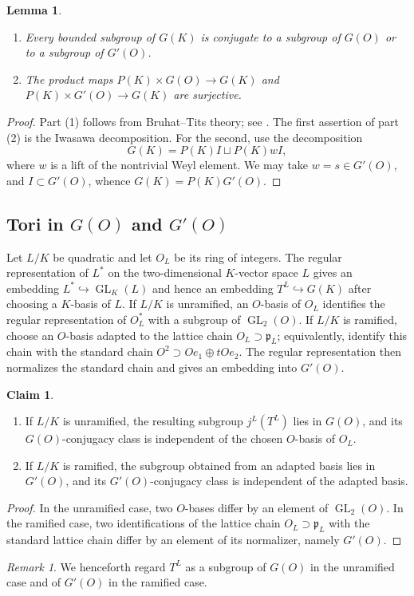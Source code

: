 \documentclass[11pt,a4paper,twoside]{amsart}
\newtheorem{lemma}[theorem]{Lemma}
\theoremstyle{definition}
\newtheorem{claim}[theorem]{Claim}
\theoremstyle{remark}
\newtheorem{remark}[theorem]{Remark}
\newcommand{\ho}{\hookrightarrow}
\begin{document}
\begin{lemma}\label{BT}
\begin{enumerate}
\item Every bounded subgroup of $G(K)$ is conjugate to a subgroup of $G(O)$ or to a subgroup of $G'(O)$.
\item The product maps $P(K)\times G(O)\to G(K)$ and $P(K)\times G'(O)\to G(K)$ are surjective.
\end{enumerate}
\end{lemma}
\begin{proof}
Part (1) follows from Bruhat--Tits theory; see \cite[Section~3.2]{BT}. The first assertion of part (2) is the Iwasawa decomposition. For the second, use the  decomposition
$$
G(K)=P(K)I\sqcup P(K)wI,
$$
where $w$ is a lift of the nontrivial Weyl element. We may take $w=s\in G'(O)$, and $I\subset G'(O)$, whence $G(K)=P(K)G'(O)$.
\end{proof}
\subsection{Tori in $G(O)$ and $G'(O)$}
Let $L/K$ be quadratic and let $O_L$ be its ring of integers. The regular representation of $L^*$ on the two-dimensional $K$-vector space $L$ gives an embedding $L^*\ho\operatorname{GL}_K(L)$ and hence an embedding $T^L\ho G(K)$ after choosing a $K$-basis of $L$.
If $L/K$ is unramified, an $O$-basis of $O_L$ identifies the regular representation of $O_L^*$ with a subgroup of $\operatorname{GL}_2(O)$. If $L/K$ is ramified, choose an $O$-basis adapted to the lattice chain $O_L\supset\mathfrak p_L$; equivalently, identify this chain with the standard chain $O^2\supset Oe_1\oplus tOe_2$. The regular representation then normalizes the standard chain and gives an embedding into $G'(O)$.
\begin{claim}\label{imb}
\begin{enumerate}
\item If $L/K$ is unramified, the resulting subgroup $j^L(T^L)$ lies in $G(O)$, and its $G(O)$-conjugacy class is independent of the chosen $O$-basis of $O_L$.
\item If $L/K$ is ramified, the subgroup obtained from an adapted basis lies in $G'(O)$, and its $G'(O)$-conjugacy class is independent of the adapted basis.
\end{enumerate}
\end{claim}
\begin{proof}
In the unramified case, two $O$-bases differ by an element of $\operatorname{GL}_2(O)$. In the ramified case, two identifications of the lattice chain $O_L\supset\mathfrak p_L$ with the standard lattice chain differ by an element of its normalizer, namely $G'(O)$.
\end{proof}
\begin{remark}\label{tor}
We henceforth regard $T^L$ as a subgroup of $G(O)$ in the unramified case and of $G'(O)$ in the ramified case.
\end{remark}
\end{document}
